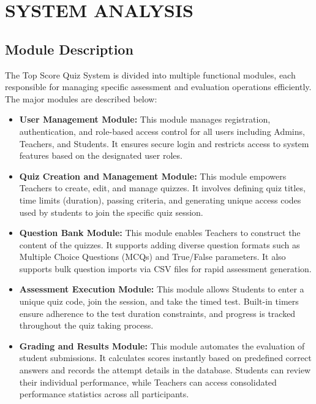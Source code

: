 \chapter{SYSTEM ANALYSIS}

\section{Module Description}

The Top Score Quiz System is divided into multiple functional modules, each responsible for managing specific assessment and evaluation operations efficiently. The major modules are described below:

\begin{itemize}

\item \textbf{User Management Module:}
This module manages registration, authentication, and role-based access control for all users including Admins, Teachers, and Students. It ensures secure login and restricts access to system features based on the designated user roles.

\item \textbf{Quiz Creation and Management Module:}
This module empowers Teachers to create, edit, and manage quizzes. It involves defining quiz titles, time limits (duration), passing criteria, and generating unique access codes used by students to join the specific quiz session.

\item \textbf{Question Bank Module:}
This module enables Teachers to construct the content of the quizzes. It supports adding diverse question formats such as Multiple Choice Questions (MCQs) and True/False parameters. It also supports bulk question imports via CSV files for rapid assessment generation.

\item \textbf{Assessment Execution Module:}
This module allows Students to enter a unique quiz code, join the session, and take the timed test. Built-in timers ensure adherence to the test duration constraints, and progress is tracked throughout the quiz taking process.

\item \textbf{Grading and Results Module:}
This module automates the evaluation of student submissions. It calculates scores instantly based on predefined correct answers and records the attempt details in the database. Students can review their individual performance, while Teachers can access consolidated performance statistics across all participants.

\end{itemize}


